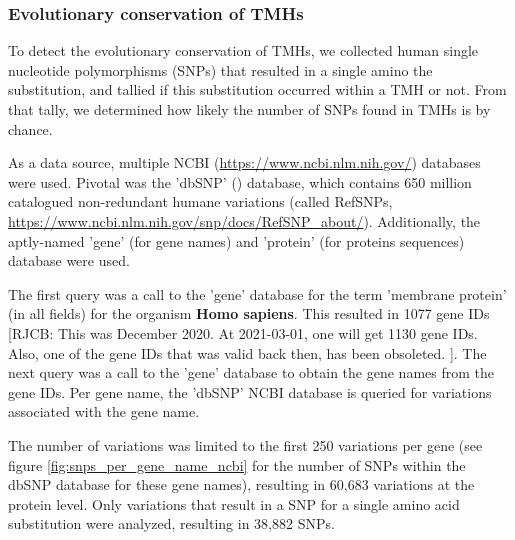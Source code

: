 \subsubsection{Evolutionary conservation of TMHs}


To detect the evolutionary conservation of TMHs,
we collected human single nucleotide polymorphisms (SNPs)
that resulted in a single amino the substitution,
and tallied if this substitution occurred within a TMH or not.
From that tally, we determined how likely the number of SNPs
found in TMHs is by chance.


As a data source, multiple
NCBI (\url{https://www.ncbi.nlm.nih.gov/}) databases were used.
Pivotal was the 'dbSNP' (\cite{sherry2001dbsnp}) database,
which contains 650 million 
catalogued non-redundant humane variations (called RefSNPs,
\url{https://www.ncbi.nlm.nih.gov/snp/docs/RefSNP_about/}).
Additionally, the aptly-named 'gene' (for gene names)
and 'protein' (for proteins sequences) database were used.


The first query was a call to the 'gene' database for the 
term 'membrane protein' (in all fields) for the organism \textbf{Homo sapiens}.
This resulted in 1077 gene IDs
[RJCB:
  This was December 2020.
  At 2021-03-01, one will get 1130 gene IDs.
  Also, one of the gene IDs that was valid back then,
  has been obsoleted.
].
The next query was a call to the 'gene' database 
to obtain the gene names from the gene IDs.
Per gene name, the 'dbSNP' NCBI database is queried for 
variations associated with the gene name. 

The number of variations
was limited to the first 250 variations per gene (see figure
\ref{fig:snps_per_gene_name_ncbi} for the number of SNPs
within the dbSNP database for these gene names),
resulting in 60,683 variations at the protein level.
Only variations that result in a SNP for
a single amino acid substitution were analyzed, resulting in 38,882 SNPs.

